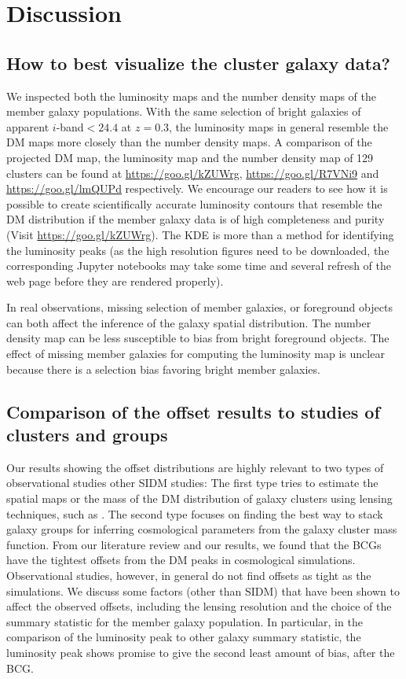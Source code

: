 \section{Discussion}\label{sec:discussion}

\subsection{How to best visualize the cluster galaxy data?}
We inspected both the luminosity maps and the
number density maps of the member galaxy populations.
With the same selection of bright galaxies of apparent $i$-band$ < 24.4$ at
$z=0.3$, the luminosity maps in general resemble the DM maps more closely than 
the number density maps.
A comparison of the projected 
DM map, the luminosity map and the number density map of 129 clusters 
can be found at \href{https://goo.gl/kZUWrg}{https://goo.gl/kZUWrg}, 
\href{https://goo.gl/R7VNi9}{https://goo.gl/R7VNi9} and
\href{https://goo.gl/lmQUPd}{https://goo.gl/lmQUPd} respectively. 
We encourage our readers to see how it is possible
to create scientifically accurate luminosity contours 
that resemble 
the DM distribution if the member galaxy
data is of high completeness and purity (Visit
\href{https://goo.gl/kZUWrg}{https://goo.gl/kZUWrg}). The KDE is more than a method for
identifying the luminosity peaks
(as the high resolution figures need to be downloaded, the 
corresponding Jupyter notebooks may take some time and several refresh of the
web page before they are rendered properly).

In real observations, missing selection of member galaxies, or 
foreground objects can both affect the inference of the galaxy spatial 
distribution. The number density map can be less susceptible to bias from bright 
foreground objects. The effect of missing member galaxies 
for computing the luminosity map is unclear because there is a selection bias favoring 
bright member galaxies.


\subsection{Comparison of the offset results to studies of clusters and groups}
Our results showing the offset distributions are highly relevant to two types of
observational studies other SIDM studies: 
The first type tries to estimate the spatial maps or 
the mass of the DM distribution of galaxy clusters 
using lensing techniques, such as \cite{Jee2014}. 
The second type focuses on finding the best way to stack galaxy groups for
inferring cosmological parameters from the galaxy cluster mass function.
From our literature review and our results, we found that
the BCGs have the tightest offsets from the DM peaks in cosmological simulations. 
Observational studies, however, in general do not find offsets as tight as the 
simulations. We discuss some factors (other than SIDM) that 
have been shown to affect the observed offsets, including the lensing resolution and the
choice of the summary statistic for the member galaxy population. In particular, 
in the comparison of the luminosity peak to other galaxy summary statistic,
the luminosity peak shows promise to give the second least amount of bias,
after the BCG. 
 
